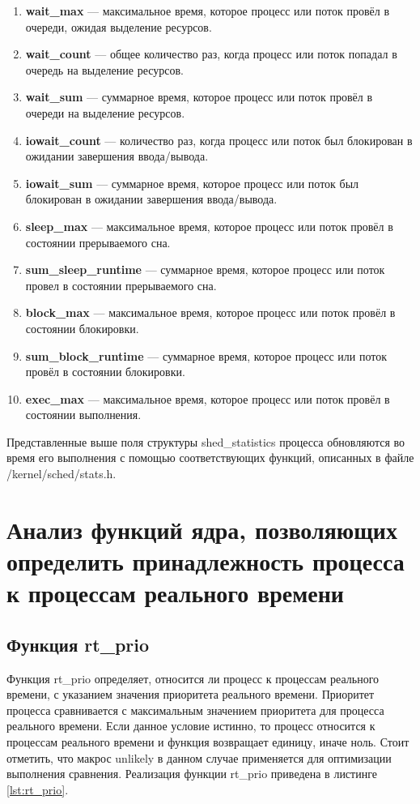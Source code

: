 \begin{enumerate}[label*=\arabic*.]
	\item \textbf{wait\_max} --- максимальное время, которое процесс или поток провёл в очереди, ожидая выделение ресурсов.
	\item \textbf{wait\_count} --- общее количество раз, когда процесс или поток попадал в очередь на выделение ресурсов.
	\item \textbf{wait\_sum} --- суммарное время, которое процесс или поток провёл в очереди на выделение ресурсов.
	\item \textbf{iowait\_count} --- количество раз, когда процесс или поток был блокирован в ожидании завершения ввода/вывода.
	\item \textbf{iowait\_sum} --- суммарное время, которое процесс или поток был блокирован в ожидании завершения ввода/вывода.
	\item \textbf{sleep\_max} --- максимальное время, которое процесс или поток провёл в состоянии прерываемого сна.
	\item \textbf{sum\_sleep\_runtime} --- суммарное время, которое процесс или поток провел в состоянии прерываемого сна.
	\item \textbf{block\_max} --- максимальное время, которое процесс или поток провёл в состоянии блокировки.
	\item \textbf{sum\_block\_runtime} --- суммарное время, которое процесс или поток провёл в состоянии блокировки.
	\item \textbf{exec\_max} --- максимальное время, которое процесс или поток провёл в состоянии выполнения.
\end{enumerate}

Представленные выше поля структуры shed\_statistics процесса обновляются во время его выполнения с помощью соответствующих функций, описанных в файле /kernel/sched/stats.h. \cite{stats}



\section{Анализ функций ядра, позволяющих определить принадлежность процесса к процессам реального времени}

\subsection{Функция rt\_prio}

Функция rt\_prio определяет, относится ли процесс к процессам реального времени, с указанием значения приоритета реального времени. Приоритет процесса сравнивается с максимальным значением приоритета для процесса реального времени. Если данное условие истинно, то процесс относится к процессам реального времени и функция возвращает единицу, иначе ноль. Стоит отметить, что макрос unlikely в данном случае применяется для оптимизации выполнения сравнения. Реализация функции rt\_prio приведена в листинге \ref{lst:rt_prio}.~\cite{rt}

